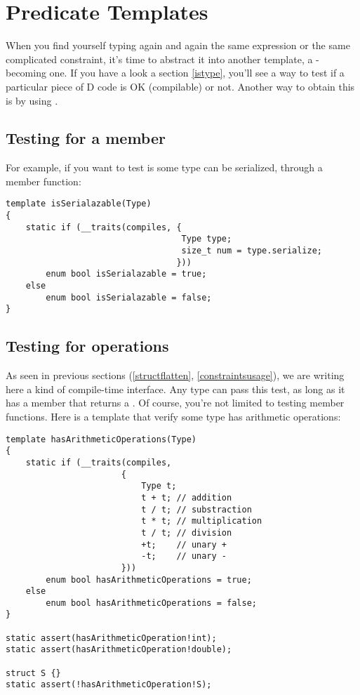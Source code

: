 \section{Predicate Templates}\label{predicates}

When you find yourself typing again and again the same  expression or the same complicated constraint, it's time to abstract it into another template, a -becoming one. If you have a look a section \ref{istype}, you'll see a way to test if a particular piece of D code is OK (compilable) or not. Another way to obtain this is by using .

\subsection{Testing for a member}

For example, if you want to test is some type can be serialized, through a  member function:

\begin{verbatim}
template isSerialazable(Type)
{
    static if (__traits(compiles, {
                                   Type type;
                                   size_t num = type.serialize;
                                  }))
        enum bool isSerialazable = true;
    else
        enum bool isSerialazable = false;
}
\end{verbatim}

\subsection{Testing for operations}

As seen in previous sections (\ref{structflatten}, \ref{constraintsusage}), we are writing here a kind of compile-time interface. Any type can pass this test, as long as it has a  member that returns a . Of course, you're not limited to testing member functions. Here is a template that verify some type has arithmetic operations:

\begin{verbatim}
template hasArithmeticOperations(Type)
{
    static if (__traits(compiles, 
                       {   
                           Type t;
                           t + t; // addition
                           t / t; // substraction
                           t * t; // multiplication
                           t / t; // division
                           +t;    // unary +
                           -t;    // unary -
                       }))
        enum bool hasArithmeticOperations = true;
    else
        enum bool hasArithmeticOperations = false;
}

static assert(hasArithmeticOperation!int);
static assert(hasArithmeticOperation!double);

struct S {}
static assert(!hasArithmeticOperation!S);
\end{verbatim}

